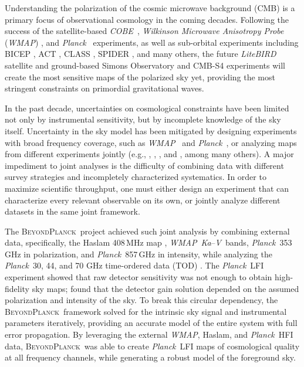 \documentclass[twocolumn]{../../common/aa}
\def\WMAP{\emph{WMAP}}
\def\COBE{\emph{COBE}}
\def\Planck{\emph{Planck}}
\newcommand{\bp}{\textsc{BeyondPlanck}}
\newcommand{\Ka}[0]{\textit{Ka}}
\newcommand{\V}[0]{\textit V}
\begin{document}
Understanding the polarization of the cosmic microwave background (CMB) is a primary focus of observational cosmology in the coming decades. Following the success of the satellite-based \COBE\ \citep{smoot:1992,mather:1994,hauser:1998}, \textit{Wilkinson Microwave Anisotropy Probe} (\WMAP) \citep{bennett2012}, and \Planck\ \citep{planck2016-l01} experiments, as well as sub-orbital experiments including BICEP \citep{bicep2021}, ACT \citep{actDR6_lensing}, CLASS \citep{eimer2023}, SPIDER \citep{spider21}, and many others, the future \textit{LiteBIRD} satellite \citep{litebird2022} and ground-based Simons Observatory \citep{SO2019} and CMB-S4 \citep{cmbs4} experiments will create the most sensitive maps of the polarized sky yet, providing the most stringent constraints on primordial gravitational waves.

In the past decade, uncertainties on cosmological constraints have been limited not only by instrumental sensitivity, but by incomplete knowledge of the sky itself. Uncertainty in the sky model has been mitigated by designing experiments with broad frequency coverage, such as \WMAP\ \citep{bennett2012} and \Planck\ \citep{planck2016-l01}, or analyzing maps from different experiments jointly (e.g., \citealp{dmr}, \citealp{bennett2012}, \citealp{planck2014-a12}, and \citealp{pb2015}, among many others).
A major impediment to joint analyses is the difficulty of combining data with different survey strategies and incompletely characterized systematics. In order to maximize scientific throughput, one must either design an experiment that can characterize every relevant observable on its own, or jointly analyze different datasets in the same joint framework.

The \bp\ project achieved such joint analysis by combining external data, specifically, the Haslam 408\,MHz map \citep{haslam1982}, \WMAP\ \Ka--\V\ bands, \Planck\ 353\,GHz in polarization, and \Planck\ 857\,GHz in intensity, while analyzing the \Planck\ 30, 44, and 70 GHz time-ordered data (TOD) \citep{bp01}.
The \Planck\ LFI experiment showed that raw detector sensitivity was not enough to obtain high-fidelity sky maps; \citet{planck2016-l02} found that the detector gain solution depended on the assumed polarization and intensity of the sky. To break this circular dependency, the \bp\ framework solved for the intrinsic sky signal and instrumental parameters iteratively, providing an accurate model of the entire system with full error propagation. By leveraging the external \WMAP, Haslam, and \Planck\ HFI  data, \bp\ was able to create \Planck\ LFI maps of cosmological quality at all frequency channels, while generating a robust model of the foreground sky.
\end{document}
